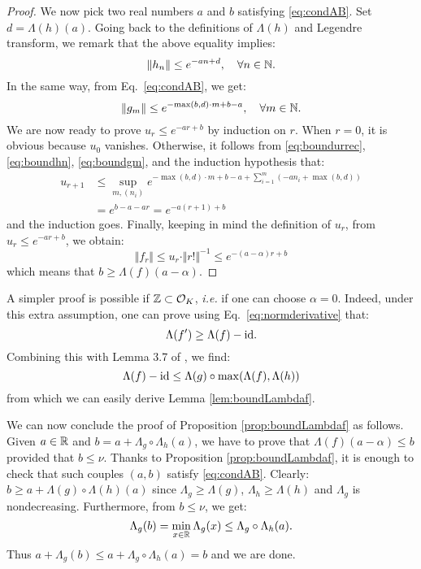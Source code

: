 \documentclass{sig-alternate}
\begin{document}
\begin{proof}
We now pick two real numbers $a$ and $b$ satisfying \eqref{eq:condAB}.
Set $d = \Lambda(h)(a)$. Going back to the definitions of $\Lambda (h)$ and Legendre transform, we remark that
the above equality implies:
\begin{equation}
\label{eq:boundhn}
\Vert h_n \Vert \leq e^{- a n + d},
  \quad \forall n \in \mathbb N.
\end{equation}
In the same way, from Eq.~\eqref{eq:condAB}, we get:
\begin{equation}
\label{eq:boundgm}
\Vert g_m \Vert \leq e^{-\!\max(b,d)\cdot m + b - a},
  \quad \forall m \in \mathbb N.
\end{equation}
We are now ready to prove $u_r \leq e^{-ar + b}$ by induction on $r$.
When $r = 0$, it is obvious because $u_0$ vanishes. Otherwise, it
follows from \eqref{eq:boundurrec}, \eqref{eq:boundhn}, \eqref{eq:boundgm}, 
and the induction hypothesis that:
\begin{align*}
u_{r+1} 
& \leq \sup_{m, (n_i)}
    e^{ -\max(b,d)\cdot m + b - a + \sum_{i=1}^m (-a n_i + \max(b,d))} \\
& = e^{ b - a - a r } = e^{ -a (r+1) + b}
\end{align*}
and the induction goes.
Finally, keeping in mind the definition of $u_r$, from $u_r \leq 
e^{-a r + b}$, we obtain:
$$\Vert f_r \Vert \leq u_r \cdot \Vert r! \Vert^{-1} \leq
e^{-(a - \alpha) r + b}$$
which means that $b \geq \Lambda(f)(a - \alpha)$.
\end{proof}

\begin{rem}
A simpler proof is possible if $\mathbb Z \subset \mathcal O_K$, \emph{i.e.} if
one can choose $\alpha = 0$. Indeed, under this extra assumption,
one can prove using Eq.~\eqref{eq:normderivative} that:
$$\Lambda(f') \geq \Lambda(f) - \textrm{id}.$$
Combining this with Lemma 3.7 of \cite{caruso-roe-vaccon:14a}, we find:
$$\Lambda(f) - \textrm{id} \leq \Lambda(g) \circ \max(\Lambda(f), \Lambda(h))$$
from which we can easily derive Lemma \ref{lem:boundLambdaf}.
\end{rem}

We can now conclude the proof of Proposition \ref{prop:boundLambdaf} as 
follows. Given $a \in \mathbb R$ and $b = a + \Lambda_g \circ \Lambda_h(a)$, we 
have to prove that $\Lambda(f)(a-\alpha) \leq b$ provided that $b \leq 
\nu$. Thanks to Proposition \ref{prop:boundLambdaf}, it is enough to 
check that such couples $(a,b)$ satisfy \eqref{eq:condAB}. Clearly:
$b \geq a + \Lambda(g) \circ \Lambda(h)(a)$
since $\Lambda_g \geq \Lambda(g)$, $\Lambda_h \geq \Lambda(h)$ and
$\Lambda_g$ is nondecreasing. Furthermore, from $b \leq \nu$, we get:
$$\Lambda_g(b) = \min_{x \in \mathbb R} \Lambda_g(x) \leq \Lambda_g \circ 
\Lambda_h(a).$$
Thus $a + \Lambda_g(b) \leq a + \Lambda_g \circ \Lambda_h(a) =
b$ and we are done.



\end{document}
